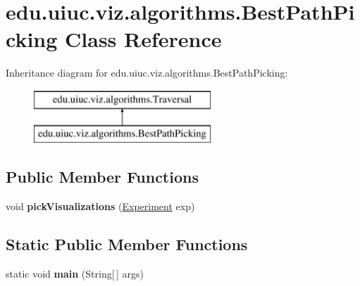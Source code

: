 \hypertarget{classedu_1_1uiuc_1_1viz_1_1algorithms_1_1_best_path_picking}{}\section{edu.\+uiuc.\+viz.\+algorithms.\+Best\+Path\+Picking Class Reference}
\label{classedu_1_1uiuc_1_1viz_1_1algorithms_1_1_best_path_picking}
Inheritance diagram for edu.\+uiuc.\+viz.\+algorithms.\+Best\+Path\+Picking\+:\begin{figure}[H]
\begin{center}
\leavevmode
\includegraphics[height=2.000000cm]{classedu_1_1uiuc_1_1viz_1_1algorithms_1_1_best_path_picking}
\end{center}
\end{figure}
\subsection*{Public Member Functions}
\begin{DoxyCompactItemize}
\item 
\mbox{\label{classedu_1_1uiuc_1_1viz_1_1algorithms_1_1_best_path_picking_a0d880de034fe635fe621fbdd60a3227f}} 
void {\bfseries pick\+Visualizations} (\mbox{\hyperlink{classedu_1_1uiuc_1_1viz_1_1algorithms_1_1_experiment}{Experiment}} exp)
\end{DoxyCompactItemize}
\subsection*{Static Public Member Functions}
\begin{DoxyCompactItemize}
\item 
\mbox{\label{classedu_1_1uiuc_1_1viz_1_1algorithms_1_1_best_path_picking_a6267b5105432ea54069f19865ce56f27}} 
static void {\bfseries main} (String\mbox{[}$\,$\mbox{]} args)
\end{DoxyCompactItemize}
